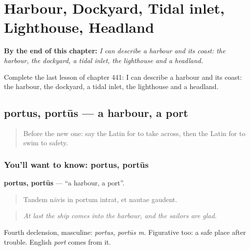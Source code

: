 
\chapter{Harbour, Dockyard, Tidal inlet, Lighthouse, Headland}
\label{ch:la-harbour-dockyard-tidal-inlet-lighthouse-headland}

\begin{chapteropening}
\textbf{By the end of this chapter:} \emph{I can describe a harbour and its coast: the harbour, the dockyard, a tidal inlet, the lighthouse and a headland.}

Complete the last lesson of chapter 441: I can describe a harbour and its coast: the harbour, the dockyard, a tidal inlet, the lighthouse and a headland.
\end{chapteropening}

\section[portus, portūs]{portus, portūs — a harbour, a port}

\label{lesson:LA-C441-portus}



\begin{quote}
Before the new one: say the Latin for to take across, then the Latin for to swim to safety.
\end{quote}

\subsection*{You'll want to know: portus, portūs}
\textbf{portus, portūs} — \textquotedblleft{}a harbour, a port\textquotedblright{}.

\begin{quote}
Tandem nāvis in portum intrat, et nautae gaudent.
\end{quote}

\begin{quote}
\emph{At last the ship comes into the harbour, and the sailors are glad.}
\end{quote}

Fourth declension, masculine: \emph{portus, portūs m.} Figurative too: a safe place after trouble. English \emph{port} comes from it.

